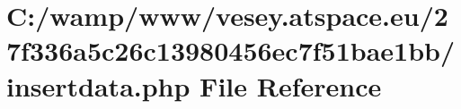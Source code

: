 \hypertarget{27f336a5c26c13980456ec7f51bae1bb_2insertdata_8php}{\section{C\-:/wamp/www/vesey.atspace.\-eu/27f336a5c26c13980456ec7f51bae1bb/insertdata.php File Reference}
\label{27f336a5c26c13980456ec7f51bae1bb_2insertdata_8php}
}
